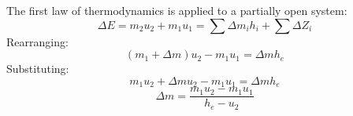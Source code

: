 The first law of thermodynamics is applied to a partially open system:  
\[
\Delta E = m_2 u_2 + m_1 u_1 = \sum \Delta m_i h_i + \sum \Delta Z_i
\]  
Rearranging:  
\[
(m_1 + \Delta m) u_2 - m_1 u_1 = \Delta m h_e
\]  
Substituting:  
\[
m_1 u_2 + \Delta m u_2 - m_1 u_1 = \Delta m h_e
\]  
\[
\Delta m = \frac{m_1 u_2 - m_1 u_1}{h_e - u_2}
\]